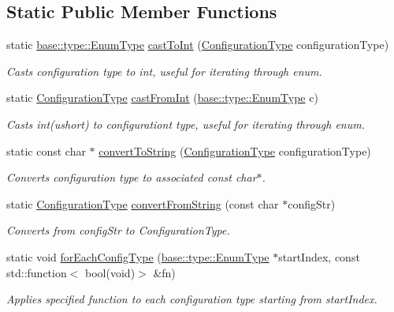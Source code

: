 \subsection*{Static Public Member Functions}
\begin{DoxyCompactItemize}
\item 
static \hyperlink{namespaceel_1_1base_1_1type_afb892a99b7545bf6e45c1e1d84af2ec9}{base\+::type\+::\+Enum\+Type} \hyperlink{classel_1_1_configuration_type_helper_aa53161071fee3ce3f371ab90c62d5fc2}{cast\+To\+Int} (\hyperlink{namespaceel_a281f5db6d6163678bc68a8b23b59e124}{Configuration\+Type} configuration\+Type)
\begin{DoxyCompactList}\small\item\em Casts configuration type to int, useful for iterating through enum. \end{DoxyCompactList}\item 
static \hyperlink{namespaceel_a281f5db6d6163678bc68a8b23b59e124}{Configuration\+Type} \hyperlink{classel_1_1_configuration_type_helper_a62301cbc966cf7e7e2a7b55cc3259996}{cast\+From\+Int} (\hyperlink{namespaceel_1_1base_1_1type_afb892a99b7545bf6e45c1e1d84af2ec9}{base\+::type\+::\+Enum\+Type} c)
\begin{DoxyCompactList}\small\item\em Casts int(ushort) to configurationt type, useful for iterating through enum. \end{DoxyCompactList}\item 
static const char $\ast$ \hyperlink{classel_1_1_configuration_type_helper_ad7f0a19c416c4a8ddaf85330b141383c}{convert\+To\+String} (\hyperlink{namespaceel_a281f5db6d6163678bc68a8b23b59e124}{Configuration\+Type} configuration\+Type)
\begin{DoxyCompactList}\small\item\em Converts configuration type to associated const char$\ast$. \end{DoxyCompactList}\item 
static \hyperlink{namespaceel_a281f5db6d6163678bc68a8b23b59e124}{Configuration\+Type} \hyperlink{classel_1_1_configuration_type_helper_af4a35305e3941fd578e55fec624eba43}{convert\+From\+String} (const char $\ast$config\+Str)
\begin{DoxyCompactList}\small\item\em Converts from config\+Str to Configuration\+Type. \end{DoxyCompactList}\item 
static void \hyperlink{classel_1_1_configuration_type_helper_aa0524147f792309fc09e0b8d14826c17}{for\+Each\+Config\+Type} (\hyperlink{namespaceel_1_1base_1_1type_afb892a99b7545bf6e45c1e1d84af2ec9}{base\+::type\+::\+Enum\+Type} $\ast$start\+Index, const std\+::function$<$ bool(void)$>$ \&fn)
\begin{DoxyCompactList}\small\item\em Applies specified function to each configuration type starting from start\+Index. \end{DoxyCompactList}\end{DoxyCompactItemize}
